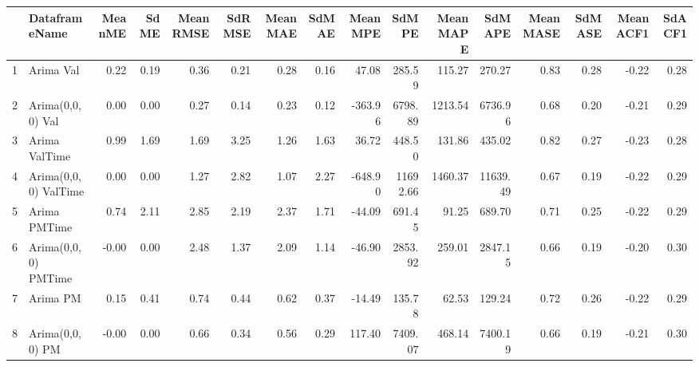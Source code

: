 \begin{table}[ht]
\centering
\begin{tabular}{rlrrrrrrrrrrrrrr}
  \hline
 & DataframeName & MeanME & SdME & MeanRMSE & SdRMSE & MeanMAE & SdMAE & MeanMPE & SdMPE & MeanMAPE & SdMAPE & MeanMASE & SdMASE & MeanACF1 & SdACF1 \\ 
  \hline
1 & Arima Val & 0.22 & 0.19 & 0.36 & 0.21 & 0.28 & 0.16 & 47.08 & 285.59 & 115.27 & 270.27 & 0.83 & 0.28 & -0.22 & 0.28 \\ 
  2 & Arima(0,0,0) Val & 0.00 & 0.00 & 0.27 & 0.14 & 0.23 & 0.12 & -363.96 & 6798.89 & 1213.54 & 6736.96 & 0.68 & 0.20 & -0.21 & 0.29 \\ 
  3 & Arima ValTime & 0.99 & 1.69 & 1.69 & 3.25 & 1.26 & 1.63 & 36.72 & 448.50 & 131.86 & 435.02 & 0.82 & 0.27 & -0.23 & 0.28 \\ 
  4 & Arima(0,0,0) ValTime & 0.00 & 0.00 & 1.27 & 2.82 & 1.07 & 2.27 & -648.90 & 11692.66 & 1460.37 & 11639.49 & 0.67 & 0.19 & -0.22 & 0.29 \\ 
  5 & Arima PMTime & 0.74 & 2.11 & 2.85 & 2.19 & 2.37 & 1.71 & -44.09 & 691.45 & 91.25 & 689.70 & 0.71 & 0.25 & -0.22 & 0.29 \\ 
  6 & Arima(0,0,0) PMTime & -0.00 & 0.00 & 2.48 & 1.37 & 2.09 & 1.14 & -46.90 & 2853.92 & 259.01 & 2847.15 & 0.66 & 0.19 & -0.20 & 0.30 \\ 
  7 & Arima PM & 0.15 & 0.41 & 0.74 & 0.44 & 0.62 & 0.37 & -14.49 & 135.78 & 62.53 & 129.24 & 0.72 & 0.26 & -0.22 & 0.29 \\ 
  8 & Arima(0,0,0) PM & -0.00 & 0.00 & 0.66 & 0.34 & 0.56 & 0.29 & 117.40 & 7409.07 & 468.14 & 7400.19 & 0.66 & 0.19 & -0.21 & 0.30 \\ 
   \hline
\end{tabular}
\end{table}
